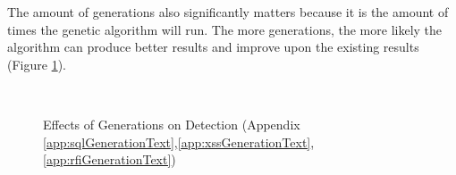 The amount of generations also significantly matters because it is the amount of times the genetic algorithm will run.  The more generations, the more likely the algorithm can produce better results and improve upon the existing results (Figure \ref{fig:resGenerations}).

\begin{figure}[hb]
	\centering
	\\
	\caption{Effects of Generations on Detection (Appendix \ref{app:sqlGenerationText},\ref{app:xssGenerationText},\ref{app:rfiGenerationText})}
	\label{fig:resGenerations}
\end{figure}

